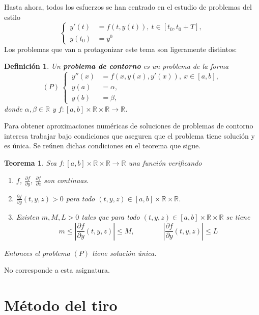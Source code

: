 \documentclass[11pt]{report}
\makeatletter
\renewenvironment{proof}[1][\proofname]{\par
  \pushQED{\qed}%
  \normalfont \topsep\z@skip %
  \trivlist
  \item[\hskip\labelsep
        \itshape
    #1\@addpunct{.}]\ignorespaces
}{%
  \popQED\endtrivlist\@endpefalse
}
\theoremstyle{mytheorem}
\newtheorem{theorem}{Teorema}
\theoremstyle{mydefinition}
\newtheorem{definition}{Definición}
\theoremstyle{myexample}
\let\oldproofname=\proofname
\renewcommand{\proofname}{\rm\bf{\oldproofname}}}
\newenvironment{cdefinition} %
  {\begin{mdframed}[
        linewidth=3pt,
        linecolor=c1,
        bottomline=false,
        topline=false,
        rightline=false,
        innerrightmargin=0pt,
        innertopmargin=0pt,
        innerbottommargin=0pt,
        innerleftmargin=1em, %
        skipabove=\baselineskip]
    \begin{definition}}
  {\end{definition}\end{mdframed}}
\newenvironment{ctheorem} %
  {\begin{mdframed}[
        linewidth=3pt,
        linecolor=c2,
        bottomline=false,
        topline=false,
        rightline=false,
        innerrightmargin=0pt,
        innertopmargin=0pt,
        innerbottommargin=0pt,
        innerleftmargin=1em, %
        skipabove=\baselineskip]
    \begin{theorem}}
  {\end{theorem}\end{mdframed}}
\newcommand{\R}{\mathbb R}
\newcommand{\mybf}[1]{\boldmath\textbf{\color{c1}#1}\unboldmath}
\makeatother
\begin{document}
Hasta ahora, todos los esfuerzos se han centrado en el estudio de problemas del estilo
\[\left\{
\begin{alignedat}{1}
\, y'(t)  &= f(t,y(t)), \ t \in [t_0,t_0+T], \\
\, y(t_0) &= y^0
\end{alignedat}\right.\]
Los problemas que van a protagonizar este tema son ligeramente distintos:
\begin{cdefinition}
    Un \mybf{problema de contorno} es un problema de la forma
\[(P) \ \left\{
\begin{alignedat}{1}
\, y''(x)  &= f(x,y(x), y'(x)), \ x \in [a,b], \\
\, y(a) &= \alpha, \\
\, y(b) &= \beta,
\end{alignedat}\right.\]
donde $\alpha,\beta \in \R$ y $f \colon[a,b] \times \R \times \R \to \R$.
\end{cdefinition}

Para obtener aproximaciones numéricas de soluciones de problemas de contorno interesa trabajar bajo condiciones que aseguren que el problema tiene solución y es única. Se reúnen dichas condiciones en el teorema que sigue.

\begin{ctheorem}
\label{teo20}
    Sea $f \colon [a,b] \times \R \times \R \to \R$ una función verificando
    \begin{enumerate}
        \item $f$, $\frac{\partial f}{\partial y}$, $\frac{\partial f}{\partial z}$ son continuas.
        \item $\frac{\partial f}{\partial y}(t,y,z) > 0$ para todo $(t,y,z) \in [a,b] \times \R \times \R$.
        \item Existen $m,M,L >0$ tales que para todo $(t,y,z) \in [a,b] \times \R \times \R$ se tiene
        \[m \leq \left|\frac{\partial f}{\partial y}(t,y,z)\right| \leq M, \qquad \qquad \left|\frac{\partial f}{\partial y} (t,y,z)\right| \leq L\]
    \end{enumerate}
    Entonces el problema $(P)$ tiene solución única.
 \end{ctheorem}

\begin{proof}
    No corresponde a esta asignatura.
\end{proof}

\section{Método del tiro}
\end{document}
